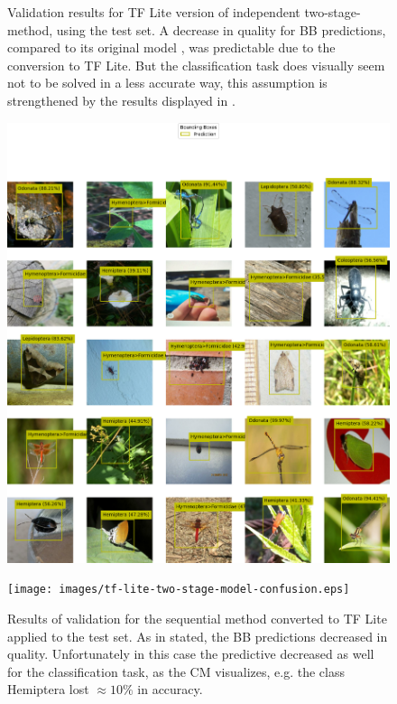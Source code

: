 \begin{figure}
\begin{multicols}{2}
\begin{minipage}{.45\textwidth}
        \end{minipage}
    \end{multicols}
    \caption{Validation results for TF Lite version of independent two-stage-method, using the test set. A decrease in quality for BB predictions, compared to its original model , was predictable due to the conversion to TF Lite. But the classification task does visually seem not to be solved in a less accurate way, this assumption is strengthened by the results displayed in .}
    \label{fig:tflite-independent-results}
\end{figure}
\begin{figure}
    \centering
    \begin{multicols}{2}
        \begin{minipage}{.45\textwidth}
            \includegraphics[width=\textwidth]{images/tf-lite-two-stage-model-predictions.png}
        \end{minipage}
        \columnbreak
        \begin{minipage}{.45\textwidth}
            \texttt{[image: images/tf-lite-two-stage-model-confusion.eps]}
        \end{minipage}
    \end{multicols}
    \caption{Results of validation for the sequential method converted to TF Lite applied to the test set. As in  stated, the BB predictions decreased in quality. Unfortunately in this case the predictive decreased as well for the classification task, as the CM visualizes, e.g. the class Hemiptera lost $\approx 10\%$ in accuracy.}
    \label{fig:tflite-sequential-results}
\end{figure}

